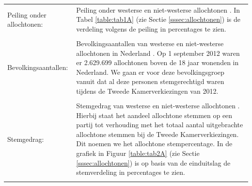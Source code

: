 \noindent\begin{tabularx}{\textwidth}{LI}
Peiling onder allochtonen: & Peiling onder westerse en niet-westerse allochtonen \citep{Opiniehuis}. In Tabel \ref{table:tab1A} (zie Sectie \ref{sssec:allochtonen}) is de verdeling volgens de peiling in percentages te zien.\\
\\
Bevolkingsaantallen: & Bevolkingsaantallen van westerse en niet-westerse allochtonen in Nederland \citep{CBS_allochtonen}. Op 1 september 2012 waren er 2.629.699 allochtonen boven de 18 jaar wonenden in Nederland. We gaan er voor deze bevolkingsgroep vanuit dat al deze personen stemgerechtigd waren tijdens de Tweede Kamerverkiezingen van 2012. \\
\\  
Stemgedrag:  & Stemgedrag van westerse en niet-westerse allochtonen \citep{CBS_stemgedrag}. Hierbij staat het aandeel allochtone stemmen op een partij tot verhouding met het totaal aantal uitgebrachte allochtone stemmen bij de Tweede Kamerverkiezingen. Dit noemen we het allochtone stempercentage. In de grafiek in Figuur \ref{table:tab2A} (zie Sectie \ref{sssec:allochtonen}) is op basis van de einduitslag de stemverdeling in percentages te zien.\\
 \\
\end{tabularx}

